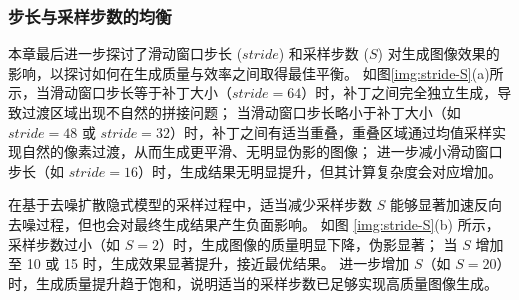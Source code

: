 \subsubsection{步长与采样步数的均衡}
本章最后进一步探讨了滑动窗口步长 ($stride$) 和采样步数 ($S$) 对生成图像效果的影响，以探讨如何在生成质量与效率之间取得最佳平衡。
如图\ref{img:stride-S}(a)所示，当滑动窗口步长等于补丁大小（$stride=64$）时，补丁之间完全独立生成，导致过渡区域出现不自然的拼接问题；
当滑动窗口步长略小于补丁大小（如 $stride=48$ 或 $stride=32$）时，补丁之间有适当重叠，重叠区域通过均值采样实现自然的像素过渡，从而生成更平滑、无明显伪影的图像；
进一步减小滑动窗口步长（如 $stride=16$）时，生成结果无明显提升，但其计算复杂度会对应增加。

在基于去噪扩散隐式模型的采样过程中，适当减少采样步数 $S$ 能够显著加速反向去噪过程，但也会对最终生成结果产生负面影响。
如图 \ref{img:stride-S}(b) 所示，采样步数过小（如 $S=2$）时，生成图像的质量明显下降，伪影显著；
当 $S$ 增加至 10 或 15 时，生成效果显著提升，接近最优结果。
进一步增加 $S$（如 $S=20$）时，生成质量提升趋于饱和，说明适当的采样步数已足够实现高质量图像生成。
